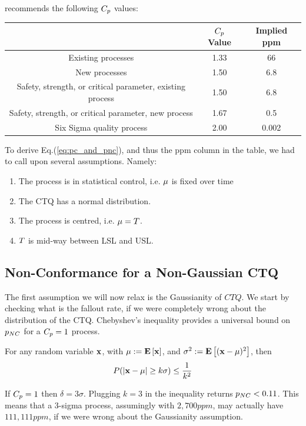 \cite{montgomery_introduction_2007} recommends the following $C_p$ values:

\begin{tabular}{|c|c|c|}
\hline  & $C_p$ Value & Implied ppm \\ 
\hline \hline Existing processes
 & 1.33
 & 66 \\ 
\hline New processes
 & 1.50
 & 6.8 \\ 
\hline Safety, strength, or critical
parameter, existing process
 & 1.50
 & 6.8 \\ 
\hline Safety, strength, or critical
parameter, new process
 & 1.67
 & 0.5 \\ 
\hline Six Sigma quality process & 2.00 &  0.002 \\ 
\hline 
\end{tabular} 

\bigskip

To derive Eq.(\ref{eq:pc_and_pnc}), and thus the ppm column in the table, we had to call upon several assumptions.
Namely:
\begin{enumerate}
\item The process is in statistical control, i.e. $\mu$ is fixed over time
\item The CTQ has a normal distribution.
\item The process is centred, i.e. $\mu=T$.
\item $T$ is mid-way between LSL and USL.
\end{enumerate}








\subsection{Non-Conformance for a Non-Gaussian CTQ}
The first assumption we will now relax is the Gaussianity of $CTQ$. 
We start by checking what is the fallout rate, if we were completely wrong about the distribution of the CTQ. 
Chebyshev's inequality provides a universal bound on $p_{NC}$ for a $C_p=1$ process.


\begin{theorem}
For any random variable $\mathbf{x}$, with $\mu:=\mathbf{E}\left[ \mathbf{x} \right]$, and $\sigma^2:=\mathbf{E}\left[ (\mathbf{x}-\mu)^2 \right]$, then
\begin{align}
	P(|\mathbf{x}-\mu| \geq k\sigma) \leq \frac{1}{k^2}
\end{align}
\end{theorem}
If $C_p=1$  then $\delta=3\sigma$. Plugging $k=3$ in the inequality returns $p_{NC}<0.11$.
This means that a 3-sigma process, assumingly with $2,700 ppm$, may actually have $111,111 ppm$, if we were wrong about the Gaussianity assumption.


